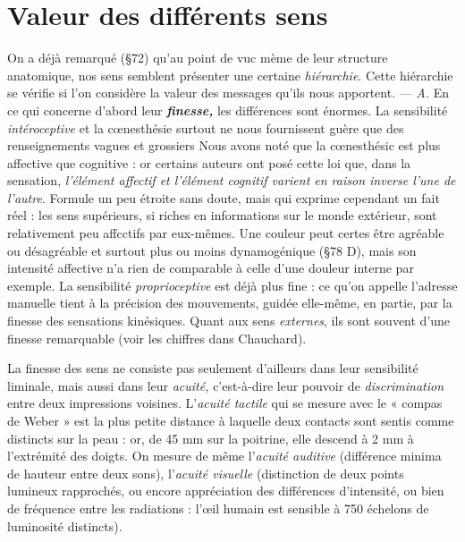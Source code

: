 \section{Valeur des différents sens}%
On a déjà remarqué (\S 72)
qu’au point de vuc mème de leur structure anatomique, nos sens
semblent présenter une certaine {\it hiérarchie}. Cette hiérarchie se vérifie si
l’on considère la valeur des messages qu’ils nous apportent. — {\it A.} En
ce qui concerne d’abord leur \textbf{\textit {finesse,}} les différences sont énormes.
La sensibilité {\it intéroceptive} et la cœnesthésie surtout ne nous fournissent
guère que des renseignements vagues et grossiers Nous avons
noté que la cœnesthésic est plus affective que cognitive : or certains
auteurs ont posé cette loi que, dans la sensation, {\it l'élément affectif et
l'élément cognitif varient en raison inverse l’une de l’autre}. Formule un
peu étroite sans doute, mais qui exprime cependant un fait réel : les
sens supérieurs, si riches en informations sur le monde extérieur,
sont relativement peu affcctifs par eux-mêmes. Une couleur peut
certes être agréable ou désagréable et surtout plus ou moins dynamogénique
(\S 78 D), mais son intensité affective n’a rien de comparable
à celle d’une douleur interne par exemple. La sensibilité
{\it proprioceptive} est déjà plus fine : ce qu’on appelle l'adresse manuelle
tient à la précision des mouvements, guidée elle-même, en partie, par
la finesse des sensations kinésiques. Quant aux sens {\it externes}, ils
sont souvent d’une finesse remarquable (voir les chiffres dans
Chauchard).

\vspace{0.24cm}
{\footnotesize 
La finesse des sens ne consiste pas seulement d’ailleurs dans leur sensibilité
liminale, mais aussi dans leur \textsf{\textit {acuité,}} c’est-à-dire leur pouvoir de
{\it discrimination} entre deux impressions voisines. L’{\it acuité tactile} qui se
mesure avec le « compas de Weber » est la plus petite distance à laquelle deux
contacts sont sentis comme distincts sur la peau : or, de 45 mm sur la
poitrine, elle descend à 2 mm à l'extrémité des doigts. On mesure de même
l'{\it acuité auditive} (différence minima de hauteur entre deux sons), l’{\it acuité
visuelle} (distinction de deux points lumineux rapprochés, ou encore appréciation
des différences d'intensité, ou bien de fréquence entre les radiations :
l'œil humain est sensible à 750 échelons de luminosité distincts).}
\vspace{0.31cm}

